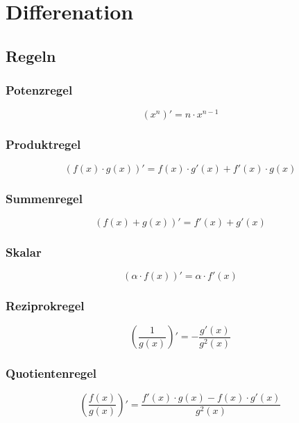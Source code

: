 \section{Differenation}

\subsection{Regeln}
\subsubsection{Potenzregel}
\begin{equation}
{\left(x^n\right)}' = n \cdot x^{n-1}
\end{equation}

\subsubsection{Produktregel}
\begin{equation}
{\left(f(x) \cdot g(x)\right)}' = f(x) \cdot g'(x) + f'(x) \cdot g(x)
\end{equation}

\subsubsection{Summenregel}
\begin{equation}
{\left(f(x) + g(x)\right)}' = f'(x) + g'(x)
\end{equation}

\subsubsection{Skalar}
\begin{equation}
{\left(\alpha\cdot f(x)\right)}' = \alpha\cdot f'(x)
\end{equation}

\subsubsection{Reziprokregel}
\begin{equation}
{\left(\frac{1}{g(x)}\right)}' = - \frac{g'(x)}{g^2(x)}
\end{equation}

\subsubsection{Quotientenregel}
\begin{equation}
{\left(\frac{f(x)}{g(x)}\right)}' = \frac{f'(x)\cdot g(x) - f(x)\cdot g'(x)}{g^2(x)}
\end{equation}


